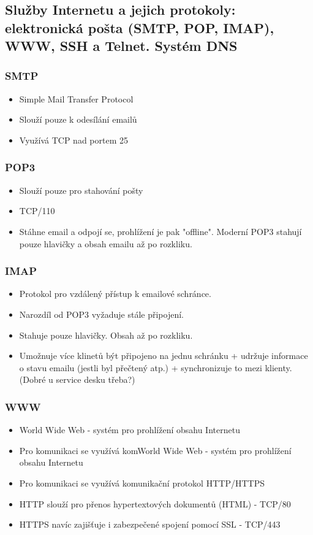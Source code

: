 \documentclass[10pt,a4paper]{article}
\begin{document}
\subsection{Služby Internetu a jejich protokoly: elektronická pošta (SMTP, POP, IMAP), WWW, SSH a Telnet. Systém DNS}
\subsubsection{SMTP}
\begin{itemize}
\item Simple Mail Transfer Protocol
\item Slouží pouze k odesílání emailů
\item Využívá TCP nad portem 25
\end{itemize}

\subsubsection{POP3}

\begin{itemize}
\item Slouží pouze pro stahování pošty
\item TCP/110
\item Stáhne email a odpojí se, prohlížení je pak "offline". Moderní POP3 stahují pouze hlavičky a obsah emailu až po rozkliku.
\end{itemize}
\subsubsection{IMAP}

\begin{itemize}
\item Protokol pro vzdálený přístup k emailové schránce.
\item Narozdíl od POP3 vyžaduje stále připojení.
\item Stahuje pouze hlavičky. Obsah až po rozkliku.
\item Umožnuje více klinetů být připojeno na jednu schránku + udržuje informace o stavu emailu (jestli byl přečtený atp.) + synchronizuje to mezi klienty. (Dobré u service desku třeba?)
\end{itemize}
\subsubsection{WWW}

\begin{itemize}
\item World Wide Web - systém pro prohlížení obsahu Internetu
\item Pro komunikaci se využívá komWorld Wide Web - systém pro prohlížení obsahu Internetu
\item Pro komunikaci se využívá komunikační protokol HTTP/HTTPS
\item HTTP slouží pro přenos hypertextových dokumentů (HTML) - TCP/80
\item HTTPS navíc zajišťuje i zabezpečené spojení pomocí SSL - TCP/443
\end{itemize}
\end{document}
